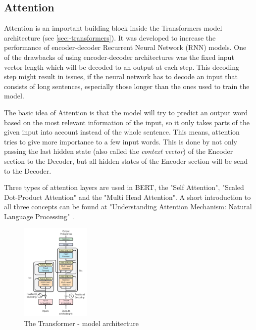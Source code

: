     
    
    \subsection{Attention}
    \label{sec:-attention}
    
        Attention is an important building block inside the Transformers model architecture (see \ref{sec:-transformers}).
        It was developed to increase the performance of encoder-decoder Recurrent Neural Network (RNN) models.
        One of the drawbacks of using encoder-decoder architectures was the fixed input vector length which will be decoded to an output at each step.
        This decoding step might result in issues, if the neural network has to decode an input that consists of long sentences, especially those longer than the ones used to train the model.

        The basic idea of Attention is that the model will try to predict an output word based on the most relevant information of the input, so it only takes parts of the given input into account instead of the whole sentence.
        This means, attention tries to give more importance to a few input words.
        This is done by not only passing the last hidden state (also called the \emph{context vector}) of the Encoder section to the Decoder, but all hidden states of the Encoder section will be send to the Decoder.

        Three types of attention layers are used in BERT, the "Self Attention", "Scaled Dot-Product Attention" and the "Multi Head Attention".
        A short introduction to all three concepts can be found at "Understanding Attention Mechanism: Natural Language Processing" \cite{understandingAttention}.

    \begin{figure}
        \caption{The Transformer - model architecture \cite[Figure 1 on page 3]{vaswani2017attention}}
        \begin{center}
            \includegraphics[width=0.3\textwidth]{figures/transformer_model_architecture.png}
        \end{center}
        \label{fig:-transformer-architecture}
    \end{figure}
    
